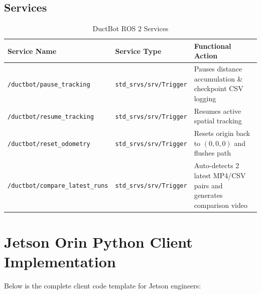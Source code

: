 \documentclass[11pt,a4paper]{article}
\begin{document}
\subsection{Services}
\begin{table}[h!]
\centering
\small
\begin{tabularx}{\textwidth}{l l X}
\toprule
\textbf{Service Name} & \textbf{Service Type} & \textbf{Functional Action} \\
\midrule
\texttt{/ductbot/pause\_tracking} & \texttt{std\_srvs/srv/Trigger} & Pauses distance accumulation \& checkpoint CSV logging \\
\texttt{/ductbot/resume\_tracking} & \texttt{std\_srvs/srv/Trigger} & Resumes active spatial tracking \\
\texttt{/ductbot/reset\_odometry} & \texttt{std\_srvs/srv/Trigger} & Resets origin back to $(0,0,0)$ and flushes path \\
\texttt{/ductbot/compare\_latest\_runs} & \texttt{std\_srvs/srv/Trigger} & Auto-detects 2 latest MP4/CSV pairs and generates comparison video \\
\bottomrule
\end{tabularx}
\caption{DuctBot ROS 2 Services}
\end{table}

\section{Jetson Orin Python Client Implementation}

Below is the complete client code template for Jetson engineers:
\end{document}

